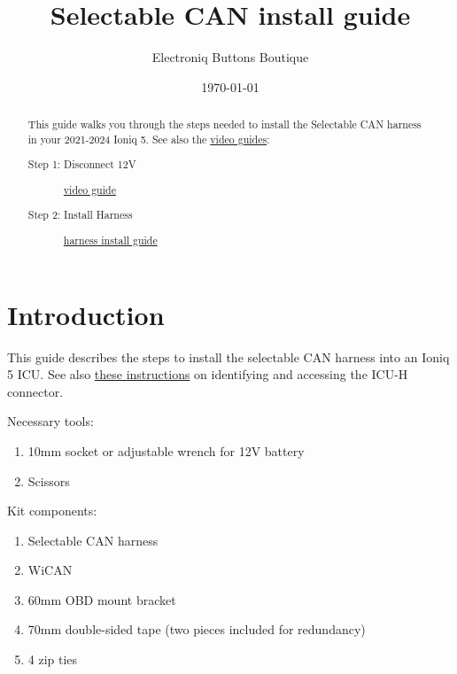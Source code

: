 \documentclass[superscriptaddress,onecolumn,floatfix]{revtex4-2}
\begin{document}
                            
\begin{abstract}
  This guide walks you through the steps needed to install the Selectable CAN harness in your 2021-2024 Ioniq 5. See also the \href{https://youtube.com/playlist?list=PLYCTmVJH4UYqnw87UZAaqMo1GrOv0cJaL}{video guides}:
  \begin{description}
    \item[Step 1: Disconnect 12V] \href{https://youtu.be/ePBdyeBYKk4}{video guide}
    \item[Step 2: Install Harness] \href{https://youtu.be/kVvkR4ZLFMI}{harness install guide}
  \end{description}
\end{abstract}
\title{Selectable CAN install guide}
\author{Electroniq Buttons Boutique}
\date{\today}

\maketitle


\section{Introduction}
This guide describes the steps to install the selectable CAN harness into an Ioniq 5 ICU. See also \href{https://github.com/dragz/explorationsincarhacking/blob/main/articles/getting_past_the_secure_gateway/getting_past_the_secure_gateway.md}{these instructions} on identifying and accessing the ICU-H connector.

Necessary tools:
\begin{enumerate}
  \item 10mm socket or adjustable wrench for 12V battery
  \item Scissors
\end{enumerate}

Kit components:
\begin{enumerate}
  \item Selectable CAN harness
  \item WiCAN
  \item 60mm OBD mount bracket
  \item 70mm double-sided tape (two pieces included for redundancy)
  \item 4 zip ties
\end{enumerate}
  
\end{document}
